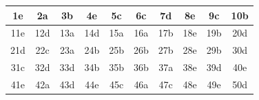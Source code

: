 \begin{center}
\renewcommand{\arraystretch}{1.2}
\begin{tabular}{|c|c|c|c|c|c|c|c|c|c|}
\hline
1e & 2a & 3b & 4e & 5c & 6c & 7d & 8e & 9c & 10b \\
\hline
11e & 12d & 13a & 14d & 15a & 16a & 17b & 18e & 19b & 20d \\
\hline
21d & 22c & 23a & 24b & 25b & 26b & 27b & 28e & 29b & 30d \\
\hline
31c & 32d & 33d & 34b & 35b & 36b & 37a & 38e & 39d & 40e \\
\hline
41e & 42a & 43d & 44e & 45c & 46a & 47c & 48e & 49e & 50d \\
\hline
\end{tabular}
\end{center}












